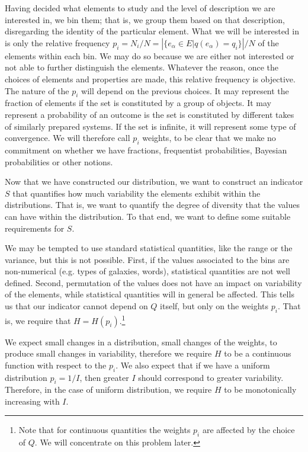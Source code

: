 \documentclass{article}
\begin{document}
Having decided what elements to study and the level of description we are interested in, we bin them; that is, we group them based on that description, disregarding the identity of the particular element. What we will be interested in is only the relative frequency $p_i = N_i / N = \left| \{e_\alpha \in E | q(e_\alpha) = q_i \} \right| / N$ of the elements within each bin. We may do so because we are either not interested or not able to further distinguish the elements. Whatever the reason, once the choices of elements and properties are made, this relative frequency is objective. The nature of the $p_i$ will depend on the previous choices. It may represent the fraction of elements if the set is constituted by a group of objects. It may represent a probability of an outcome is the set is constituted by different takes of similarly prepared systems. If the set is infinite, it will represent some type of convergence. We will therefore call $p_i$ weights, to be clear that we make no commitment on whether we have fractions, frequentist probabilities, Bayesian probabilities or other notions.

Now that we have constructed our distribution, we want to construct an indicator $S$ that quantifies how much variability the elements exhibit within the distributions. That is, we want to quantify the degree of diversity that the values can have within the distribution. To that end, we want to define some suitable requirements for $S$.

We may be tempted to use standard statistical quantities, like the range or the variance, but this is not possible. First, if the values associated to the bins are non-numerical (e.g. types of galaxies, words), statistical quantities are not well defined. Second, permutation of the values does not have an impact on variability of the elements, while statistical quantities will in general be affected. This tells us that our indicator cannot depend on $Q$ itself, but only on the weights $p_i$. That is, we require that $H=H(p_i)$.\footnote{Note that for continuous quantities the weights $p_i$ are affected by the choice of $Q$. We will concentrate on this problem later.}

We  expect small changes in a distribution, small changes of the weights, to produce small changes in variability, therefore we require $H$ to be a continuous function with respect to the $p_i$. We also expect that if we have a uniform distribution $p_i = 1/I$, then greater $I$ should correspond to greater variability. Therefore, in the case of uniform distribution, we require $H$ to be monotonically increasing with $I$.
\end{document}
